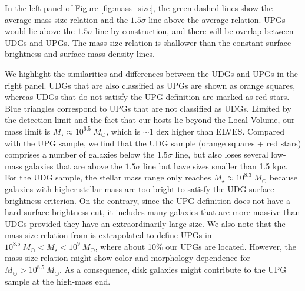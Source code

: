 \documentclass[twocolumn,astrosymb,twocolappendix]{aastex631}
\begin{document}
\begin{CJK*}{UTF8}{gbsn}
In the left panel of Figure \ref{fig:mass_size}, the green dashed lines show the average mass-size relation and the $1.5\sigma$ line above the average relation. UPGs would lie above the $1.5\sigma$ line by construction, and there will be overlap between UDGs and UPGs. The mass-size relation is shallower than the constant surface brightness and surface mass density lines. 

We highlight the similarities and differences between the UDGs and UPGs in the right panel. UDGs that are also classified as UPGs are shown as orange squares, whereas UDGs that do not satisfy the UPG definition are marked as red stars. Blue triangles correspond to UPGs that are not classified as UDGs. Limited by the detection limit and the fact that our hosts lie beyond the Local Volume, our mass limit is $M_\star \approx 10^{6.5}\ M_\odot$, which is $\sim 1$ dex higher than ELVES. 
Compared with the UPG sample, we find that the UDG sample (orange squares + red stars) comprises a number of galaxies below the $1.5\sigma$ line, but also loses several low-mass galaxies that are above the $1.5\sigma$ line but have sizes smaller than 1.5 kpc. For the UDG sample, the stellar mass range only reaches $M_\star\approx 10^{8.3}\ M_\odot$ because galaxies with higher stellar mass are too bright to satisfy the UDG surface brightness criterion. On the contrary, since the UPG definition does not have a hard surface brightness cut, it includes many galaxies that are more massive than UDGs provided they have an extraordinarily large size. We also note that the mass-size relation from \citet{ELVES-I} is extrapolated to define UPGs in $10^{8.5}\ M_\odot < M_\star < 10^9\ M_\odot$, where about 10\% our UPGs are located. However, the mass-size relation might show color and morphology dependence for $M_\odot > 10^{8.5}\ M_\odot$. As a consequence, disk galaxies might contribute to the UPG sample at the high-mass end. 



\end{CJK*}
\end{document}
